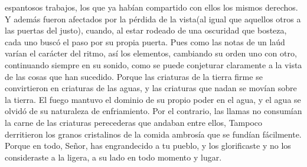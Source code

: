 espantosos trabajos, los que ya habían compartido con ellos los mismos
derechos.  Y además fueron afectados por la pérdida de la
vista(al igual que aquellos otros a las puertas del justo), cuando, al
estar rodeado de una oscuridad que bosteza, cada uno buscó el paso por
su propia puerta.  Pues como las notas de un laúd varían
el carácter del ritmo, así los elementos, cambiando su orden uno con
otro, continuando siempre en su sonido, como se puede conjeturar
claramente a la vista de las cosas que han sucedido. 
Porque las criaturas de la tierra firme se convirtieron en criaturas de
las aguas, y las criaturas que nadan se movían sobre la tierra.
 El fuego mantuvo el dominio de su propio poder en el
agua, y el agua se olvidó de su naturaleza de enfriamiento.
 Por el contrario, las llamas no consumían la carne de
las criaturas perecederas que andaban entre ellos, Tampoco derritieron
los granos cristalinos de la comida ambrosía que se fundían fácilmente.
 Porque en todo, Señor, has engrandecido a tu pueblo, y
los glorificaste y no los consideraste a la ligera, a su lado en todo
momento y lugar.

